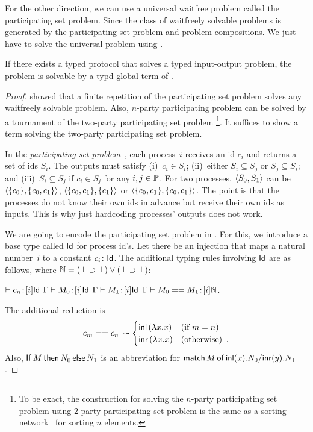  For the other direction, we can use a universal waitfree problem called
 the participating set problem.
 Since the class of waitfreely solvable problems is generated by the
 participating set problem and problem compositions.
 We just have to solve the universal problem using \lgd.
\begin{theorem}
 \label{th:completeness}
If there exists a typed protocol that solves a typed input-output
problem, the problem is solvable by a typd global term of \lgd.
\end{theorem}

\begin{proof}
\citet{Herlihy99} showed that a finite repetition
 of the participating set
 problem solves any waitfreely solvable problem.
 Also, $n$-party participating problem can be solved by a tournament of
 the two-party participating set problem%
 \footnote{To be exact, the construction for solving the $n$-party
 participating set problem using 2-party participating set problem
 is the same as a sorting network~\citep{batcher1968} for sorting $n$
 elements.}.
 It suffices to show a \lgd\, term solving the two-party participating
 set problem.

In the \textit{participating set problem}~\cite{borowsky},
each process~$i$ receives an id $c_i$ and
returns a set of ids $S_i$.
The outputs must satisfy (i)~$c_i\in S_i$; (ii)~either $S_i\subseteq S_j$
or $S_j\subseteq S_i$; and (iii)~$S_i\subseteq S_j$  if $c_i\in S_j$ for any
$i,j\in\mathbb{P}$.
For two processes,
$\langle{S_0, S_1}\rangle$ can be $\langle{\{c_0\}, \{c_0, c_1\}}\rangle$, $\langle{\{c_0, c_1\}, \{c_1\}}\rangle$
or $\langle{\{c_0, c_1\}, \{c_0, c_1\}}\rangle$.
 The point is that the processes do not know their own ids in advance
 but receive their own ids as inputs.
 This is why just hardcoding processes' outputs does not work.

We are going to encode the participating set problem in \lgd.
For this, we introduce a base type called $\mathsf{Id}$ for process id's.
Let there be an injection that maps a natural number~$i$ to a constant
$c_i\colon\mathsf{Id}$.
The additional typing rules involving $\mathsf{Id}$ are as follows, where $\mathbb{N} = (\bot\supset\bot)\vee(\bot\supset\bot)$:
\begin{center}
 \UnaryRule{}{}
 {$\vdash {c_n} \mathord{\colon\kern -2pt}{[i]\mathsf{Id}}$}
 \hfill
 \BinaryRule
 {$\Gamma\vdash {M_0} \mathord{\colon\kern -2pt}{[}i]\mathsf{Id}$}
 {$\Gamma\vdash {M_1} \mathord{\colon\kern -2pt}{[}i]\mathsf{Id}$}
 {}
 {$\Gamma \vdash {{M_0} == {M_1}} \mathord{\colon\kern -2pt}{[i]\mathbb{N}}$}\enspace.
\end{center}
The additional reduction is
\[
 c_m == c_n \rightsquigarrow
\begin{cases}
 \mathsf{inl}\left({\lambda x.x}\right)& (\text{if } m = n)\\
 \mathsf{inr}\left({\lambda x.x}\right)& (\text{otherwise})\enspace.
\end{cases}
\]
Also,
${\mathsf{If}\, {M}\, \mathsf{then}\, {N_0}\, \mathsf{else}\, {N_1}}$
is an abbreviation for
${\mathsf{match}\,{M}\,\mathsf{of}\, \mathsf{inl}({x}). {N_0}/ \mathsf{inr}({y}). {N_1}}$.


\end{proof}
